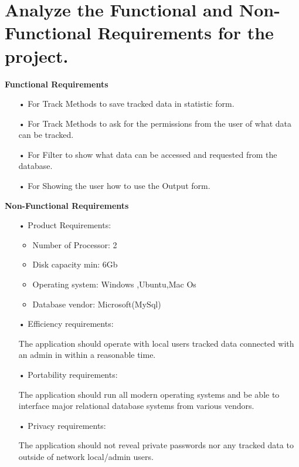 \section{Analyze the Functional and Non-Functional Requirements for the project.}
\textbf{Functional Requirements}
\begin{enumerate}
\item[•] For Track Methods to save tracked data in statistic form.
\item[•] For Track Methods to ask for the permissions from the user of what data can be tracked.
\item[•] For Filter to show what data can be accessed and requested from the database.
\item[•] For Showing the user how to use the Output form.
\end{enumerate}
\textbf{Non-Functional Requirements}
\begin{enumerate}
\item[•] Product Requirements:
\begin{itemize}
\item Number of Processor: 2
\item Disk capacity min: 6Gb
\item Operating system: Windows ,Ubuntu,Mac Os
\item Database vendor: Microsoft(MySql)
\end{itemize}
\item[•] Efficiency requirements:\par
The application should operate with local users tracked data connected with an admin in within a reasonable time.
\item[•] Portability requirements:\par 
The application should run all modern operating systems and be able to interface major relational database systems from various vendors.
\item[•] Privacy requirements:\par The application should not reveal private passwords nor any tracked data to outside of network local/admin users.
\end{enumerate}
\clearpage
